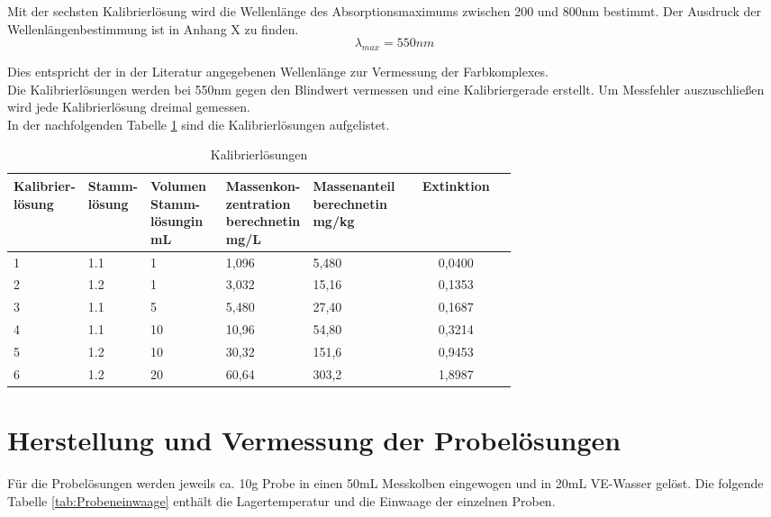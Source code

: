 
Mit der sechsten Kalibrierlösung wird die Wellenlänge des Absorptionsmaximums zwischen 200 und 800nm bestimmt. Der Ausdruck der Wellenlängenbestimmung ist in Anhang X zu finden.\\

\[
  \lambda_{max} = 550 nm
\]

Dies entspricht der in der Literatur angegebenen Wellenlänge zur Vermessung der Farbkomplexes.\\
Die Kalibrierlösungen werden bei 550nm gegen den Blindwert vermessen und eine Kalibriergerade erstellt. Um Messfehler auszuschließen wird jede Kalibrierlösung dreimal gemessen.\\
In der nachfolgenden Tabelle \ref{tab:Kalibrierlösungen} sind die Kalibrierlösungen aufgelistet.

\begin{table}[htbp]
	\centering
		\begin{tabular}{p{0.1\linewidth}|p{0.1\linewidth}|p{0.15\linewidth}|p{0.15\linewidth}|p{0.15\linewidth}|c} 
			Kalibrier-lösung & Stamm-lösung & Volumen Stamm-lösung\newline in mL & Massenkon-zentration berechnet\newline in mg/L & Massenanteil berechnet\newline in mg/kg & Extinktion\\
			\hline
			1 & 1.1 & 1 & 1,096 & 5,480 & 0,0400\\
			\hline
			2 & 1.2 & 1 & 3,032 & 15,16 & 0,1353\\
			\hline
			3 & 1.1 & 5 & 5,480 & 27,40 & 0,1687\\
			\hline
			4 & 1.1 & 10 & 10,96 & 54,80 & 0,3214\\
			\hline
			5 & 1.2 & 10 & 30,32 & 151,6 & 0,9453\\
			\hline
			6 & 1.2 & 20 & 60,64 & 303,2 & 1,8987\\
		\end{tabular}
	\caption{Kalibrierlösungen}
	\label{tab:Kalibrierlösungen}
\end{table}


\section{Herstellung und Vermessung der Probelösungen}

Für die Probelösungen werden jeweils ca. 10g Probe in einen 50mL Messkolben eingewogen und in 20mL VE-Wasser gelöst. Die folgende Tabelle \ref{tab:Probeneinwaage} enthält die Lagertemperatur und die Einwaage der einzelnen Proben. 

